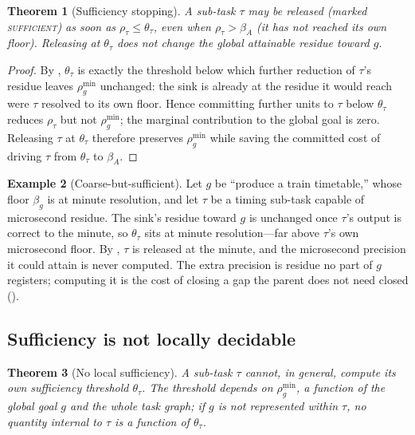\documentclass[twocolumn,10pt,a4paper]{article}
\theoremstyle{thmstyle}
\newtheorem{theorem}{Theorem}[section]
\theoremstyle{definition}
\newtheorem{example}[theorem]{Example}
\theoremstyle{remark}
\newcommand{\floor}{\beta}
\newcommand{\res}{\rho}
\newcommand{\task}{\tau}
\begin{document}
\begin{theorem}[Sufficiency stopping]
\label{thm:sufficiency}
A sub-task $\task$ may be released (marked \textsc{sufficient}) as soon as
$\res_\task\le\theta_\task$, even when $\res_\task>\floor_A$ (it has not
reached its own floor). Releasing at $\theta_\task$ does not change the
global attainable residue toward $g$.
\end{theorem}

\begin{proof}
By , $\theta_\task$ is exactly the threshold below
which further reduction of $\task$'s residue leaves $\res_g^{\min}$
unchanged: the sink is already at the residue it would reach were
$\task$ resolved to its own floor. Hence committing further units to
$\task$ below $\theta_\task$ reduces $\res_\task$ but not $\res_g^{\min}$;
the marginal contribution to the global goal is zero. Releasing $\task$ at
$\theta_\task$ therefore preserves $\res_g^{\min}$ while saving the
committed cost of driving $\task$ from $\theta_\task$ to $\floor_A$.
\end{proof}

\begin{example}[Coarse-but-sufficient]
\label{ex:timetable}
Let $g$ be ``produce a train timetable,'' whose floor $\floor_g$ is at
minute resolution, and let $\task$ be a timing sub-task capable of
microsecond residue. The sink's residue toward $g$ is unchanged once
$\task$'s output is correct to the minute, so $\theta_\task$ sits at
minute resolution---far above $\task$'s own microsecond floor. By
, $\task$ is released at the minute, and the
microsecond precision it could attain is never computed. The extra
precision is residue no part of $g$ registers; computing it is the cost of
closing a gap the parent does not need closed ().
\end{example}

\subsection{Sufficiency is not locally decidable}

\begin{theorem}[No local sufficiency]
\label{thm:nolocal}
A sub-task $\task$ cannot, in general, compute its own sufficiency
threshold $\theta_\task$. The threshold depends on $\res_g^{\min}$, a
function of the global goal $g$ and the whole task graph; if $g$ is not
represented within $\task$, no quantity internal to $\task$ is a function
of $\theta_\task$.
\end{theorem}
\end{document}
